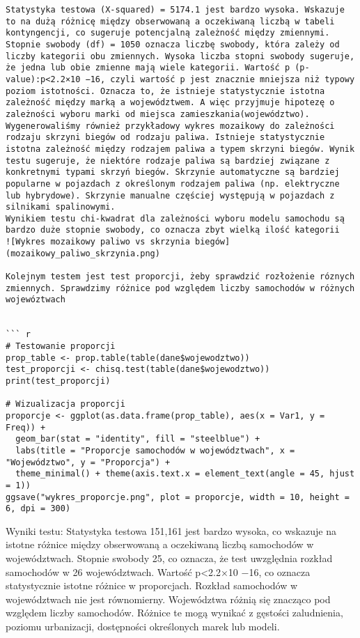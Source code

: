 \documentclass[
]{article}
\begin{document}
\begin{verbatim}
Statystyka testowa (X-squared) = 5174.1 jest bardzo wysoka. Wskazuje to na dużą różnicę między obserwowaną a oczekiwaną liczbą w tabeli kontyngencji, co sugeruje potencjalną zależność między zmiennymi. Stopnie swobody (df) = 1050 oznacza liczbę swobody, która zależy od liczby kategorii obu zmiennych. Wysoka liczba stopni swobody sugeruje, że jedna lub obie zmienne mają wiele kategorii. Wartość p (p-value):p<2.2×10 −16, czyli wartość p jest znacznie mniejsza niż typowy poziom istotności. Oznacza to, że istnieje statystycznie istotna zależność między marką a województwem. A więc przyjmuje hipotezę o zależności wyboru marki od miejsca zamieszkania(województwo).
Wygenerowaliśmy również przykładowy wykres mozaikowy do zależności rodzaju skrzyni biegów od rodzaju paliwa. Istnieje statystycznie istotna zależność między rodzajem paliwa a typem skrzyni biegów. Wynik testu sugeruje, że niektóre rodzaje paliwa są bardziej związane z konkretnymi typami skrzyń biegów. Skrzynie automatyczne są bardziej popularne w pojazdach z określonym rodzajem paliwa (np. elektryczne lub hybrydowe). Skrzynie manualne częściej występują w pojazdach z silnikami spalinowymi.
Wynikiem testu chi-kwadrat dla zależności wyboru modelu samochodu są bardzo duże stopnie swobody, co oznacza zbyt wielką ilość kategorii 
![Wykres mozaikowy paliwo vs skrzynia biegów](mozaikowy_paliwo_skrzynia.png)

Kolejnym testem jest test proporcji, żeby sprawdzić rozłożenie róznych zmiennych. Sprawdzimy różnice pod względem liczby samochodów w różnych wojewóztwach


``` r
# Testowanie proporcji
prop_table <- prop.table(table(dane$wojewodztwo))
test_proporcji <- chisq.test(table(dane$wojewodztwo))
print(test_proporcji)

# Wizualizacja proporcji
proporcje <- ggplot(as.data.frame(prop_table), aes(x = Var1, y = Freq)) +
  geom_bar(stat = "identity", fill = "steelblue") +
  labs(title = "Proporcje samochodów w województwach", x = "Województwo", y = "Proporcja") +
  theme_minimal() + theme(axis.text.x = element_text(angle = 45, hjust = 1))
ggsave("wykres_proporcje.png", plot = proporcje, width = 10, height = 6, dpi = 300)
\end{verbatim}

Wyniki testu: Statystyka testowa 151,161 jest bardzo wysoka, co wskazuje
na istotne różnice między obserwowaną a oczekiwaną liczbą samochodów w
województwach. Stopnie swobody 25, co oznacza, że test uwzględnia
rozkład samochodów w 26 województwach. Wartość p\textless2.2×10 −16, co
oznacza statystycznie istotne różnice w proporcjach. Rozkład samochodów
w województwach nie jest równomierny. Województwa różnią się znacząco
pod względem liczby samochodów. Różnice te mogą wynikać z gęstości
zaludnienia, poziomu urbanizacji, dostępności określonych marek lub
modeli.
\end{document}
